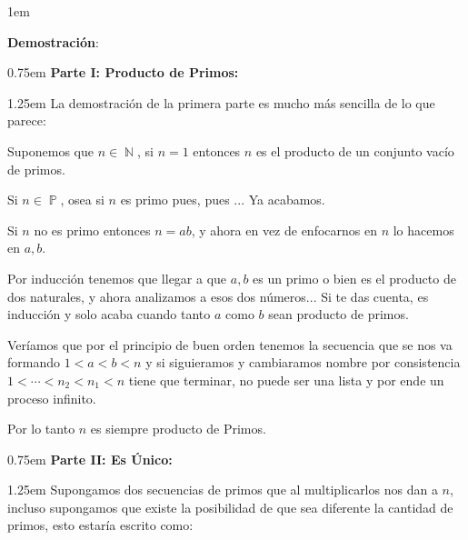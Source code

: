 \documentclass[12pt, fleqn]{report}                             %
\newenvironment{Indentation}[1][0.75em]                         %
    {\begin{adjustwidth}{#1}{}}                                     %
    {\end{adjustwidth}}                                             %
\newenvironment{SmallIndentation}[1][0.75em]                    %
    {\begin{adjustwidth}{#1}{}\begin{footnotesize}}                 %
    {\end{footnotesize}\end{adjustwidth}}                           %
\DeclareMathOperator \Naturals  {\mathbb{N}}                     %
\DeclareMathOperator \Primes    {\mathbb{P}}                     %
\begin{document}
        \begin{SmallIndentation}[1em]
            \textbf{Demostración}:\\


            \begin{Indentation}[0.75em]
                \textbf{Parte I: Producto de Primos:}
            \end{Indentation}

            \begin{Indentation}[1.25em]
                La demostración de la primera parte es mucho más sencilla
                de lo que parece:

                Suponemos que $n \in \Naturals$, si $n=1$ entonces $n$ es el
                producto de un conjunto vacío de primos.

                Si $n \in \Primes$, osea si $n$ es primo pues, pues ... Ya acabamos.

                Si $n$ no es primo entonces $n=ab$, y ahora en vez de enfocarnos en 
                $n$ lo hacemos en $a,b$.

                Por inducción tenemos que llegar a que $a,b$ es un primo o bien
                es el producto de dos naturales, y ahora analizamos a esos dos números...
                Si te das cuenta, es inducción y solo acaba cuando tanto $a$ como $b$ sean
                producto de primos.

                Veríamos que por el principio de buen orden tenemos la secuencia que se
                nos va formando $1 < a < b < n$ y si siguieramos y cambiaramos nombre
                por consistencia $1 <\cdots<n_2<n_1<n$ tiene que terminar, no puede ser
                una lista y por ende un proceso infinito.

                Por lo tanto $n$ es siempre producto de Primos.
            \end{Indentation}

            \begin{Indentation}[0.75em]
                \textbf{Parte II: Es Único:}
            \end{Indentation}

            \begin{Indentation}[1.25em]
                Supongamos dos secuencias de primos que al multiplicarlos nos dan
                a $n$, incluso supongamos que existe la posibilidad de que sea
                diferente la cantidad de primos, esto estaría escrito como:


\end{Indentation}
\end{SmallIndentation}
\end{document}
